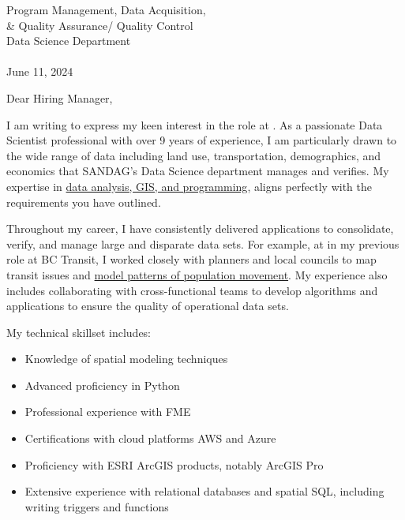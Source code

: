 \documentclass[letterpaper]{article}
\newcommand{\impt}[1]{\uline{#1}}
\begin{document}
\large
Program Management, Data Acquisition, \\
\qquad \& Quality Assurance/ Quality Control \\
Data Science Department \\
\textbf{\JobCompany} \\

\null\hfill June 11, 2024

Dear Hiring Manager,

I am writing to express my keen interest in the
\impt{\JobTitle} role at {\JobCompany}.
As a passionate Data Scientist professional with over 9 years of
experience, I am particularly drawn to the wide range of data
including land use, transportation, demographics, and economics 
that SANDAG's Data Science department manages and verifies.
My expertise in \impt{data analysis, GIS, and programming}, 
aligns perfectly with the requirements you have outlined.

Throughout my career, I have consistently delivered applications to
consolidate, verify, and manage large and disparate data sets.
For example, at in my previous role at BC Transit, I worked closely with
planners and local councils to map transit issues and
\impt{model patterns of population movement}.
My experience also includes collaborating with cross-functional teams to
develop algorithms and applications to ensure the quality of operational data sets.

My technical skillset includes:
\vspace{-12pt}
\begin{itemize} \itemsep 0pt
\item Knowledge of spatial modeling techniques
\item Advanced proficiency in Python
\item Professional experience with FME
\item Certifications with cloud platforms AWS and Azure
\item Proficiency with ESRI ArcGIS products, notably ArcGIS Pro
\item Extensive experience with relational databases and spatial SQL, including writing triggers and functions
\end{itemize}
\end{document}
